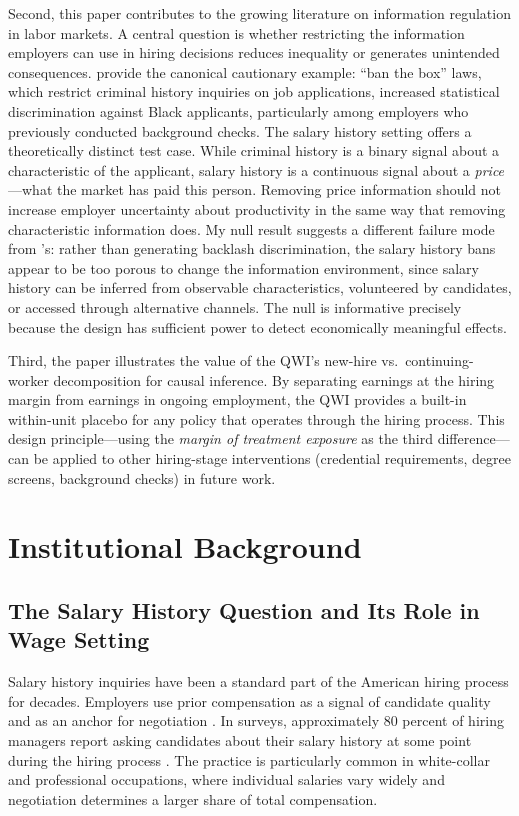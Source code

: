 \documentclass[12pt]{article}
\begin{document}
Second, this paper contributes to the growing literature on information regulation in labor markets. A central question is whether restricting the information employers can use in hiring decisions reduces inequality or generates unintended consequences. \citet{agan2018ban} provide the canonical cautionary example: ``ban the box'' laws, which restrict criminal history inquiries on job applications, increased statistical discrimination against Black applicants, particularly among employers who previously conducted background checks. The salary history setting offers a theoretically distinct test case. While criminal history is a binary signal about a characteristic of the applicant, salary history is a continuous signal about a \textit{price}---what the market has paid this person. Removing price information should not increase employer uncertainty about productivity in the same way that removing characteristic information does. My null result suggests a different failure mode from \citeauthor{agan2018ban}'s: rather than generating backlash discrimination, the salary history bans appear to be too porous to change the information environment, since salary history can be inferred from observable characteristics, volunteered by candidates, or accessed through alternative channels. The null is informative precisely because the design has sufficient power to detect economically meaningful effects.

Third, the paper illustrates the value of the QWI's new-hire vs.\ continuing-worker decomposition for causal inference. By separating earnings at the hiring margin from earnings in ongoing employment, the QWI provides a built-in within-unit placebo for any policy that operates through the hiring process. This design principle---using the \textit{margin of treatment exposure} as the third difference---can be applied to other hiring-stage interventions (credential requirements, degree screens, background checks) in future work.


\section{Institutional Background}\label{sec:background}

\subsection{The Salary History Question and Its Role in Wage Setting}

Salary history inquiries have been a standard part of the American hiring process for decades. Employers use prior compensation as a signal of candidate quality and as an anchor for negotiation \citep{kahneman1992reference}. In surveys, approximately 80 percent of hiring managers report asking candidates about their salary history at some point during the hiring process \citep{shrm2018survey}. The practice is particularly common in white-collar and professional occupations, where individual salaries vary widely and negotiation determines a larger share of total compensation.
\end{document}
